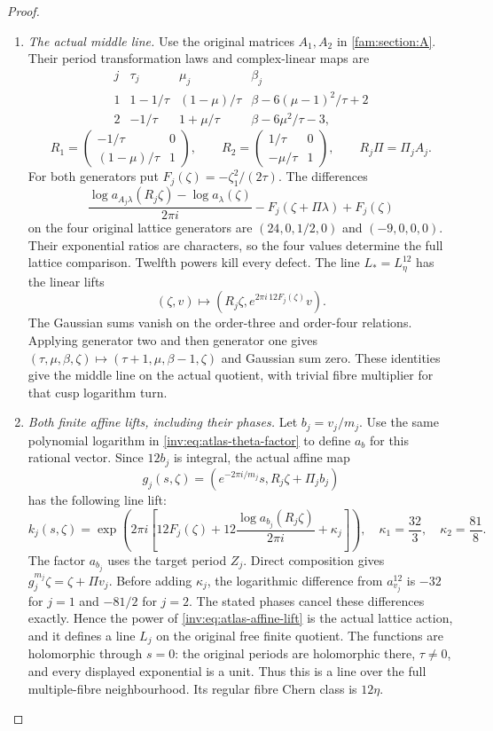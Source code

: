 \begin{proof}
\begin{enumerate}[label=\arabic*.,leftmargin=*]
\item \emph{The actual middle line.}
Use the original matrices $A_1,A_2$ in \cref{fam:section:A}.
Their period transformation laws and complex-linear maps are
\[
\begin{array}{c|ccc}
j&\tau_j&\mu_j&\beta_j\\\hline
1&1-1/\tau&(1-\mu)/\tau&\beta-6(\mu-1)^2/\tau+2\\
2&-1/\tau&1+\mu/\tau&\beta-6\mu^2/\tau-3,
\end{array}
\]
\[
 R_1=\begin{pmatrix}-1/\tau&0\\(1-\mu)/\tau&1\end{pmatrix},
 \qquad R_2=\begin{pmatrix}1/\tau&0\\-\mu/\tau&1\end{pmatrix},
 \qquad R_j\Pi=\Pi_jA_j.
\]
For both generators put $F_j(\zeta)=-\zeta_1^2/(2\tau)$.
The differences
\[
 \frac{\log a_{A_j\lambda}(R_j\zeta)-\log a_\lambda(\zeta)}{2\pi i}
 -F_j(\zeta+\Pi\lambda)+F_j(\zeta)
\]
on the four original lattice generators are
$(24,0,1/2,0)$ and $(-9,0,0,0)$.  Their exponential ratios are
characters, so the four values determine the full lattice comparison.
Twelfth powers kill every defect.  The line $L_*=L_\eta^{12}$ has
the linear lifts
\[
 (\zeta,v)\longmapsto
 (R_j\zeta,e^{2\pi i\,12F_j(\zeta)}v).
\]
The Gaussian sums vanish on the order-three and order-four relations.
Applying generator two and then generator one gives
$(\tau,\mu,\beta,\zeta)\mapsto(\tau+1,\mu,\beta-1,\zeta)$
and Gaussian sum zero.  These identities give the middle line on the
actual quotient, with trivial fibre multiplier for that cusp logarithm
turn.

\item \emph{Both finite affine lifts, including their phases.}
Let $b_j=v_j/m_j$.  Use the same polynomial logarithm in
\eqref{inv:eq:atlas-theta-factor} to define $a_b$ for this rational
vector.  Since $12b_j$ is integral, the actual affine map
\[
 g_j(s,\zeta)=(e^{-2\pi i/m_j}s,
                R_j\zeta+\Pi_jb_j)
\]
has the following line lift:
\begin{equation}\label{inv:eq:atlas-affine-lift}
 k_j(s,\zeta)=\exp\left(2\pi i
 \left[12F_j(\zeta)+12\frac{\log a_{b_j}(R_j\zeta)}{2\pi i}
                  +\kappa_j\right]\right),
 \quad \kappa_1=\frac{32}{3},\quad\kappa_2=\frac{81}{8}.
\end{equation}
The factor $a_{b_j}$ uses the target period $Z_j$.
Direct composition gives $g_j^{m_j}\zeta=\zeta+\Pi v_j$.
Before adding $\kappa_j$, the logarithmic difference from
$a_{v_j}^{12}$ is $-32$ for $j=1$ and $-81/2$ for $j=2$.
The stated phases cancel these differences exactly.  Hence the power
of \eqref{inv:eq:atlas-affine-lift} is the actual lattice action,
and it defines a line $L_j$ on the original free finite quotient.
The functions are holomorphic through $s=0$: the original periods
are holomorphic there, $\tau\ne0$, and every displayed exponential
is a unit.  Thus this is a line over the full multiple-fibre
neighbourhood.  Its regular fibre Chern class is $12\eta$.


\end{enumerate}
\end{proof}
